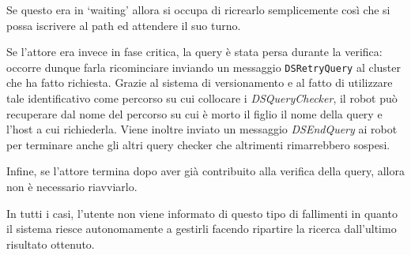 Se questo era in `waiting' allora si occupa
di ricrearlo semplicemente così che si possa iscrivere al path ed
attendere il suo turno.

Se l'attore era invece in fase critica, la query è stata persa durante
la verifica: occorre dunque farla ricominciare inviando un messaggio
\texttt{DSRetryQuery} al cluster che ha fatto richiesta.
Grazie al sistema di versionamento e al fatto di utilizzare tale
identificativo come percorso su cui collocare i \emph{DSQueryChecker},
il robot può recuperare dal nome del percorso su cui è morto il figlio
il nome della query e l'host a cui richiederla.
Viene inoltre inviato un messaggio \emph{DSEndQuery} ai robot
per terminare anche gli altri query checker che altrimenti rimarrebbero
sospesi.

Infine, se l'attore termina dopo aver già contribuito alla verifica
della query, allora non è necessario riavviarlo.

In tutti i casi, l'utente non viene informato di questo tipo di
fallimenti in quanto il sistema riesce autonomamente a gestirli
facendo ripartire la ricerca dall'ultimo risultato ottenuto.

